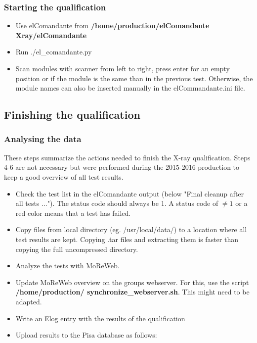 \documentclass[a4paper,12pt,twoside]{article}
\begin{document}
\subsubsection{Starting the qualification}

\begin{itemize}
\item Use elComandante from \textbf{/home/production/elComandante{\color{Red} Xray}/elComandante}
\item Run ./el\_comandante.py
\item Scan modules with scanner from left to right, press enter for an empty position or if the module is the same than in the previous test. Otherwise, the module names can also be inserted manually in the elCommandante.ini file.
\end{itemize}


\subsection{Finishing the qualification}

\subsubsection{Analysing the data}

These steps summarize the actions needed to finish the X-ray qualification. Steps 4-6 are not necessary but were performed during the 2015-2016 production to keep a good overview of all test results.

\begin{itemize}
\item Check the test list in the elComandante output (below "Final cleanup after all tests ..."). The status code should always be 1. A status code of $\neq 1$ or a red color means that a test has failed. 
\item Copy files from local directory (eg. /usr/local/data/) to a location where all test results are kept. Copying .tar files and extracting them is faster than copying the full uncompressed directory. 
\item Analyze the tests with MoReWeb.
\item Update MoReWeb overview on the groups webserver. For this, use the script \textbf{/home/production/ synchronize\_webserver.sh}. This might need to be adapted.
\item Write an Elog entry with the results of the qualification
\item Upload results to the Pisa database as follows:
\end{itemize}
\end{document}
